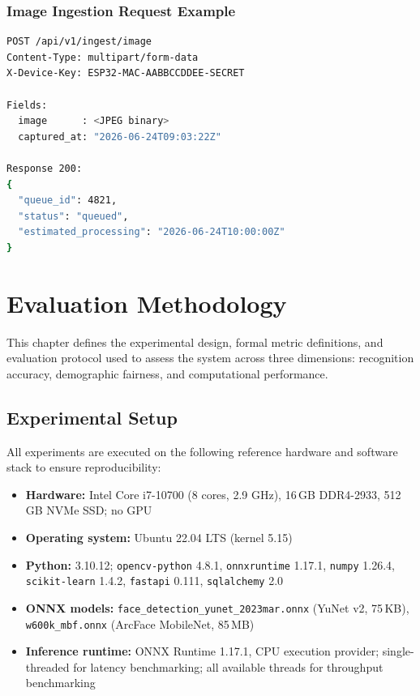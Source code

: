 \documentclass[12pt,a4paper]{report}
\begin{document}
\subsection{Image Ingestion Request Example}
\begin{lstlisting}[language=bash, caption={ESP32 POST to image ingestion endpoint}]
POST /api/v1/ingest/image
Content-Type: multipart/form-data
X-Device-Key: ESP32-MAC-AABBCCDDEE-SECRET

Fields:
  image      : <JPEG binary>
  captured_at: "2026-06-24T09:03:22Z"

Response 200:
{
  "queue_id": 4821,
  "status": "queued",
  "estimated_processing": "2026-06-24T10:00:00Z"
}
\end{lstlisting}

\chapter{Evaluation Methodology}
\label{chap:eval}

This chapter defines the experimental design, formal metric definitions, and evaluation protocol used to assess the system across three dimensions: recognition accuracy, demographic fairness, and computational performance.

\section{Experimental Setup}
\label{sec:eval-setup}

All experiments are executed on the following reference hardware and software stack to ensure reproducibility:

\begin{itemize}
  \item \textbf{Hardware:} Intel Core i7-10700 (8 cores, 2.9 GHz), 16\,GB DDR4-2933, 512\,GB NVMe SSD; no GPU
  \item \textbf{Operating system:} Ubuntu 22.04 LTS (kernel 5.15)
  \item \textbf{Python:} 3.10.12; \texttt{opencv-python} 4.8.1, \texttt{onnxruntime} 1.17.1, \texttt{numpy} 1.26.4, \texttt{scikit-learn} 1.4.2, \texttt{fastapi} 0.111, \texttt{sqlalchemy} 2.0
  \item \textbf{ONNX models:} \texttt{face\_detection\_yunet\_2023mar.onnx} (YuNet v2, 75\,KB), \texttt{w600k\_mbf.onnx} (ArcFace MobileNet, 85\,MB)
  \item \textbf{Inference runtime:} ONNX Runtime 1.17.1, CPU execution provider; single-threaded for latency benchmarking; all available threads for throughput benchmarking
\end{itemize}
\end{document}
